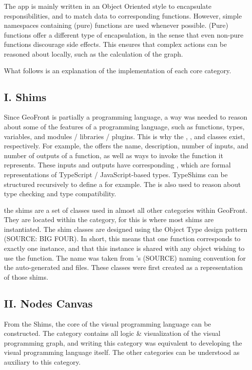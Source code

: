 The app is mainly written in an Object Oriented style to encapsulate responsibilities, and to match data to corresponding functions. However, simple namespaces containing (pure) functions are used whenever possible. (Pure) functions offer a different type of encapsulation, in the sense that even non-pure functions discourage side effects. This ensures that complex actions can be reasoned about locally, such as the calculation of the graph. 

What follows is an explanation of the implementation of each core category.

\subsection*{ I. Shims }

Since GeoFront is partially a programming language, a way was needed to reason about some of the features of a programming language, such as functions, types, variables, and modules / libraries / plugins. 
This is why the , ,  and  classes exist, respectively. 
For example, the  offers the name, description, number of inputs, and number of outputs of a function, as well as ways to invoke the function it represents.
These inputs and outputs have corresponding , which are formal representations of TypeScript / JavaScript-based types. TypeShims can be structured recursively to define a  for example. The  is also used to reason about type checking and type compatibility.

the shims are a set of classes used in almost all other categories within GeoFront. They are located within the  category, for this is where most shims are instantiated.
The shim classes are designed using the Object Type design pattern (SOURCE: BIG FOUR). In short, this means that one function corresponds to exactly one  instance, and that this instance is shared with any object wishing to use the function. 
The name  was taken from 's (SOURCE) naming convention for the auto-generated  and  files. These classes were first created as a representation of those shims.


\subsection*{ II. Nodes Canvas }
From the Shims, the core of the visual programming language can be constructed. The  category contains all logic \& visualization of the visual programming graph, and writing this category was equivalent to developing the visual programming language itself. The other categories can be understood as auxiliary to this category.

